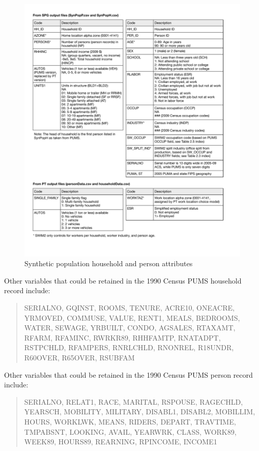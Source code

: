 \begin{figure}
\centering
\includegraphics[width=7in]{overview/synthetic-attributes}
\caption{Synthetic population household and person attributes}\label{fig:synthetic-attributes}
\end{figure}

\noindent Other variables that could be retained in the 1990 Census PUMS household record include:
\begin{quote}
SERIALNO, GQINST, ROOMS, TENURE, ACRE10, ONEACRE, YRMOVED, COMMUSE, VALUE, RENT1, MEALS, BEDROOMS, WATER, SEWAGE, YRBUILT, CONDO, AGSALES, RTAXAMT, RFARM, RFAMINC, RWRKR89, RHHFAMTP, RNATADPT, RSTPCHLD, RFAMPERS, RNRLCHLD, RNONREL, R18UNDR, R60OVER, R65OVER, RSUBFAM
\end{quote}

\noindent Other variables that could be retained in the 1990 Census PUMS person record include:
\begin{quote}
SERIALNO, RELAT1, RACE, MARITAL, RSPOUSE, RAGECHLD, YEARSCH, MOBILITY, MILITARY, DISABL1, DISABL2, MOBILLIM, HOURS, WORKLWK, MEANS, RIDERS, DEPART, TRAVTIME, TMPABSNT, LOOKING, AVAIL, YEARWRK, CLASS, WORK89, WEEK89, HOURS89, REARNING, RPINCOME, INCOME1
\end{quote}
 
